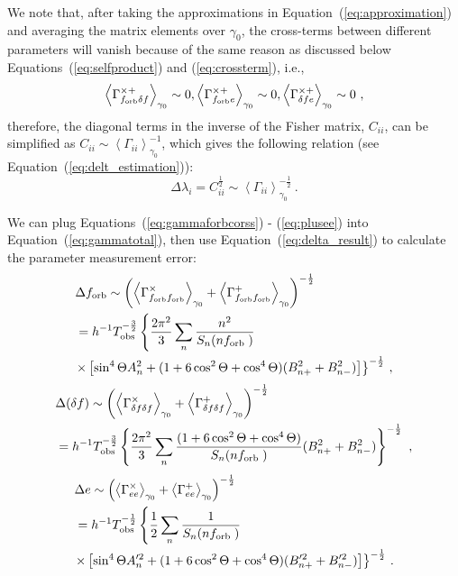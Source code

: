 \documentclass[%
 reprint,
 amsmath,amssymb,
 aps,
]{revtex4-2}
\begin{document}
We note that, after taking the approximations in Equation~(\ref{eq:approximation}) and averaging the matrix elements over $\gamma_0$, the cross-terms between different parameters will vanish because of the same reason as discussed below Equations~(\ref{eq:selfproduct}) and (\ref{eq:crossterm}), i.e., 
\begin{equation}
    \left\langle\Gamma^{\times+}_{f_{\rm orb} \delta f}\right\rangle_{\gamma_0}\sim 0,\left\langle \Gamma^{\times+}_{f_{\rm orb} e}\right\rangle_{\gamma_0}\sim 0,\left\langle \Gamma^{\times+}_{\delta f e}\right\rangle_{\gamma_0} \sim 0\ ,\label{eq:nocrossterms}
\end{equation}
therefore, the diagonal terms in the inverse of the Fisher matrix, $C_{ii}$, can be simplified as $C_{i i} \sim \left\langle\Gamma_{ii} \right\rangle_{\gamma_0}^{-1}$, which gives the following relation (see Equation~(\ref{eq:delt_estimation})):
\begin{equation}
\Delta \lambda_{i}=C_{i i}^{\frac{1}{2}} \sim \left\langle\Gamma_{ii} \right\rangle_{\gamma_0}^{-\frac{1}{2}}\ .\label{eq:delta_result}
\end{equation}

We can plug Equations~(\ref{eq:gammaforbcorss}) - (\ref{eq:plusee}) into Equation~(\ref{eq:gammatotal}), then use Equation~(\ref{eq:delta_result}) to calculate the parameter measurement error:
\begin{align}\label{eq:dforb}
&\Delta f_{\rm orb}\sim \left(\left\langle \Gamma^{\times}_{f_{\rm orb} f_{\rm orb}}\right\rangle_{\gamma_0}+\left\langle \Gamma^{+}_{f_{\rm orb} f_{\rm orb}}\right\rangle_{\gamma_0} \right)^{-\frac{1}{2}}\nonumber\\
& = h^{-1}T_{\rm obs}^{-\frac{3}{2}}\left\{\frac{2\pi^2}{3} \sum_n \frac{n^2}{S_n(nf_{\text {orb }})} \right.\\
&{\left.\times \left[\sin ^4 \Theta A_{n}^2+(1+6\cos ^2 \Theta+\cos ^4 \Theta)( B_{n+}^2 + B_{n-}^2) \right] \right\}^{-\frac{1}{2}}}\nonumber\ ,
\end{align}
\begin{align}\label{eq:ddf}
& \Delta (\delta f) \sim \left(\left\langle \Gamma^{\times}_{\delta f \delta f}\right\rangle_{\gamma_0}+\left\langle \Gamma^{+}_{\delta f \delta f}\right\rangle_{\gamma_0} \right)^{-\frac{1}{2}} \\
& = h^{-1}T_{\rm obs}^{-\frac{3}{2}}\left\{\frac{2\pi^2}{3} \sum_n \frac{(1+6\cos ^2 \Theta+\cos ^4 \Theta)}{S_n(nf_{\text {orb }})} ( B_{n+}^2 + B_{n-}^2) \right\}^{-\frac{1}{2}}\nonumber\ ,
\end{align}
\begin{align}\label{eq:de}
&\Delta e\sim \left(\left\langle \Gamma^{\times}_{ee}\right\rangle_{\gamma_0}+\left\langle \Gamma^{+}_{ee}\right\rangle_{\gamma_0} \right)^{-\frac{1}{2}}\nonumber\\
& = h^{-1}T_{\rm obs}^{-\frac{1}{2}}\left\{ \frac{1}{2}\sum_n \frac{1}{S_n(nf_{\text {orb }})} \right.\\
&{\left.\times \left[\sin ^4 \Theta A_{n}^{\prime2}+(1+6\cos ^2 \Theta+\cos ^4 \Theta)( B_{n+}^{\prime2} + B_{n-}^{\prime2}) \right] \right\}^{-\frac{1}{2}}}\nonumber\ .
\end{align}
\end{document}
